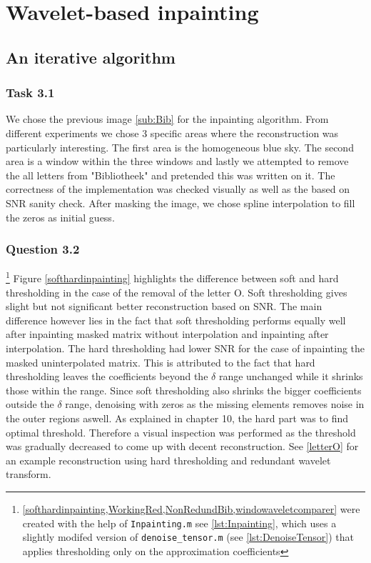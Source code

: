 \documentclass[a4paper]{article}
\begin{document}
	\newpage
	
    \section{Wavelet-based inpainting} \label{sec:Inpainting}

    \subsection{An iterative algorithm}

\subsubsection{Task 3.1}
We chose the previous image \cref{sub:Bib} for the inpainting algorithm. From different experiments we chose 3 specific areas where the reconstruction was particularly interesting. The first area is the homogeneous blue sky. The second area is a window within the three windows and lastly we attempted to remove the all letters from "Bibliotheek" and pretended this was written on it. The correctness of the implementation was checked visually as well as the based on SNR sanity check. After masking the image, we chose spline interpolation to fill the zeros as initial guess. 
\subsubsection{Question 3.2}

\footnote{\cref{softhardinpainting,WorkingRed,NonRedundBib,windowaveletcomparer} were created with the help of \texttt{Inpainting.m} see \cref{lst:Inpainting}, which uses a slightly modifed version of \texttt{denoise\_tensor.m} (see \cref{lst:DenoiseTensor}) that applies thresholding only on the approximation coefficients} Figure \ref{softhardinpainting} highlights the difference between soft and hard thresholding in the case of the removal of the letter O. Soft thresholding gives slight but not significant better reconstruction based on SNR. The main difference however lies in the fact that soft thresholding performs equally well after inpainting masked matrix without interpolation and inpainting after interpolation. The hard thresholding had lower SNR for the case of inpainting the masked uninterpolated matrix. This is attributed to the fact that hard thresholding leaves the coefficients beyond the $\delta$ range unchanged while it shrinks those within the range. Since soft thresholding also shrinks the bigger coefficients outside the $\delta$ range, denoising with zeros as the missing elements removes noise in the outer regions aswell. As explained in chapter 10, the hard part was to find optimal threshold. Therefore a visual inspection was performed as the threshold was gradually decreased to come up with decent reconstruction. See \cref{letterO} for an example reconstruction using hard thresholding and redundant wavelet transform.
\end{document}

